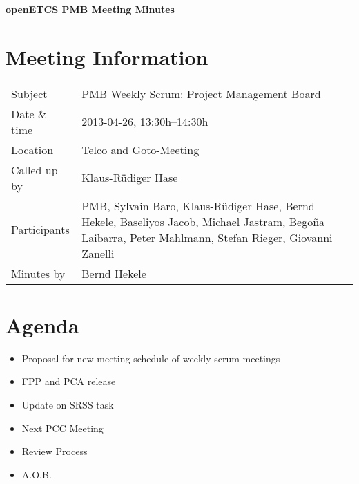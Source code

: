 \documentclass[a4paper, 11pt]{article}
\begin{document}
{\begin{center}\huge\bf openETCS PMB Meeting Minutes\end{center}}
\section{Meeting Information}

\renewcommand{\arraystretch}{1.5}
\begin{supertabular}{m{.2\textwidth}m{.8\textwidth}}
Subject & PMB Weekly Scrum: Project Management Board\\
Date \& time & 2013-04-26, 13:30h--14:30h\\
Location & Telco and Goto-Meeting\\
Called up by & Klaus-R\"udiger Hase\\
Participants & PMB,
Sylvain Baro,
Klaus-R\"udiger Hase,
Bernd Hekele,
Baseliyos Jacob,
Michael Jastram, 
Bego\~na Laibarra,
Peter Mahlmann, 
Stefan Rieger,
Giovanni Zanelli\\

Minutes by & Bernd Hekele\\

\end{supertabular}
\renewcommand{\arraystretch}{1.0}


\section{{Agenda}}
\begin{itemize}
\item Proposal for new meeting schedule of weekly scrum meetings
\item FPP and PCA release
\item Update on SRSS task
\item Next PCC Meeting
\item Review Process
\item A.O.B.
\end{itemize}
\end{document}
